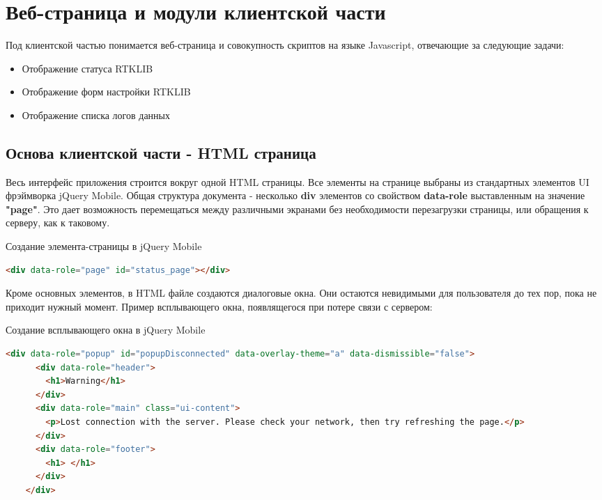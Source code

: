 \section{Веб-страница и модули клиентской части} \label{sect3_2}

Под клиентской частью понимается веб-страница и совокупность скриптов на языке Javascript, отвечающие за следующие задачи:

\begin{itemize}
  \item Отображение статуса RTKLIB
  \item Отображение форм настройки RTKLIB
  \item Отображение списка логов данных
\end{itemize}

\subsection{Основа клиентской части - HTML страница} \label{subsect3_2_1}

Весь интерфейс приложения строится вокруг одной HTML страницы. Все элементы на странице выбраны из стандартных элементов UI фрэймворка jQuery Mobile. Общая структура документа - несколько \textbf{div} элементов со свойством \textbf{data-role} выставленным на значение \textbf{"page"}. Это дает возможность перемещаться между различными экранами без необходимости перезагрузки страницы, или обращения к серверу, как к таковому.

\begin{ListingEnv}[H]
  \caption{Создание элемента-страницы в jQuery Mobile}
  \label{list:hwbeauty}
  \begin{lstlisting}[language=HTML]
    <div data-role="page" id="status_page"></div>
  \end{lstlisting}
\end{ListingEnv}

Кроме основных элементов, в HTML файле создаются диалоговые окна. Они остаются невидимыми для пользователя до тех пор, пока не приходит нужный момент. Пример всплывающего окна, появлящегося при потере связи с сервером:

\begin{ListingEnv}[H]
  \caption{Создание всплывающего окна в jQuery Mobile}
  \label{list:hwbeauty}
  \begin{lstlisting}[language=HTML]
    <div data-role="popup" id="popupDisconnected" data-overlay-theme="a" data-dismissible="false">
      <div data-role="header">
        <h1>Warning</h1>
      </div>
      <div data-role="main" class="ui-content">
        <p>Lost connection with the server. Please check your network, then try refreshing the page.</p>
      </div>
      <div data-role="footer">
        <h1> </h1>
      </div>
    </div>
  \end{lstlisting}
\end{ListingEnv}

